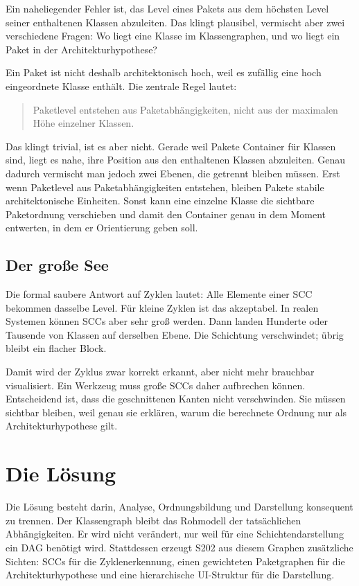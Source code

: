 \documentclass[a4paper,11pt]{article}
\begin{document}
Ein naheliegender Fehler ist, das Level eines Pakets aus dem h\"ochsten Level
seiner enthaltenen Klassen abzuleiten. Das klingt plausibel, vermischt aber
zwei verschiedene Fragen: Wo liegt eine Klasse im Klassengraphen, und wo liegt
ein Paket in der Architekturhypothese?

Ein Paket ist nicht deshalb architektonisch hoch, weil es zuf\"allig eine hoch
eingeordnete Klasse enth\"alt. Die zentrale Regel lautet:

\begin{quote}
  Paketlevel entstehen aus Paketabh\"angigkeiten, nicht aus der maximalen
  H\"ohe einzelner Klassen.
\end{quote}

Das klingt trivial, ist es aber nicht. Gerade weil Pakete Container f\"ur
Klassen sind, liegt es nahe, ihre Position aus den enthaltenen Klassen
abzuleiten. Genau dadurch vermischt man jedoch zwei Ebenen, die getrennt
bleiben m\"ussen. Erst wenn Paketlevel aus Paketabh\"angigkeiten entstehen,
bleiben Pakete stabile architektonische Einheiten. Sonst kann eine einzelne
Klasse die sichtbare Paketordnung verschieben und damit den Container genau in
dem Moment entwerten, in dem er Orientierung geben soll.

\subsection{Der gro\ss{}e See}

Die formal saubere Antwort auf Zyklen lautet: Alle Elemente einer SCC bekommen
dasselbe Level. F\"ur kleine Zyklen ist das akzeptabel. In realen Systemen
k\"onnen SCCs aber sehr gro\ss{} werden. Dann landen Hunderte oder Tausende von
Klassen auf derselben Ebene. Die Schichtung verschwindet; \"ubrig bleibt ein
flacher Block.

Damit wird der Zyklus zwar korrekt erkannt, aber nicht mehr brauchbar
visualisiert. Ein Werkzeug muss gro\ss{}e SCCs daher aufbrechen k\"onnen.
Entscheidend ist, dass die geschnittenen Kanten nicht verschwinden. Sie m\"ussen
sichtbar bleiben, weil genau sie erkl\"aren, warum die berechnete Ordnung nur
als Architekturhypothese gilt.

\section{Die L\"osung}

Die L\"osung besteht darin, Analyse, Ordnungsbildung und Darstellung konsequent
zu trennen. Der Klassengraph bleibt das Rohmodell der tats\"achlichen
Abh\"angigkeiten. Er wird nicht ver\"andert, nur weil f\"ur eine
Schichtendarstellung ein DAG ben\"otigt wird. Stattdessen erzeugt S202 aus
diesem Graphen zus\"atzliche Sichten: SCCs f\"ur die Zyklenerkennung, einen
gewichteten Paketgraphen f\"ur die Architekturhypothese und eine hierarchische
UI-Struktur f\"ur die Darstellung.
\end{document}
